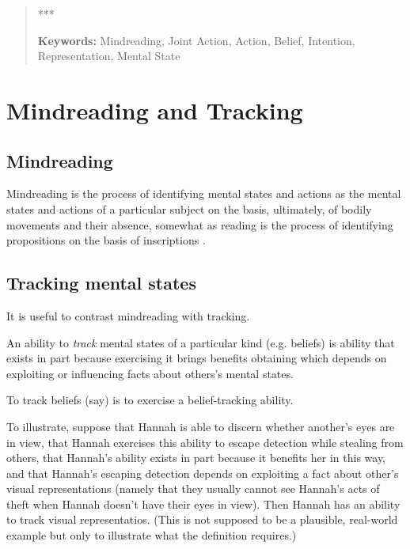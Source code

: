 \documentclass[12pt,\papersize]{extarticle}
\begin{document}
\setlength\footnotesep{1em}




\maketitle

\begin{abstract}
\noindent
***
\ 

\noindent
\textbf{Keywords:}
Mindreading, Joint Action, Action, Belief, Intention, Representation, Mental State
\end{abstract}




\section{Mindreading and Tracking}

\subsection{Mindreading}
Mindreading is 
	the process of 
	identifying mental states and actions 
	as the mental states and actions 	of a particular subject 
	on the basis, ultimately, of bodily movements and their absence,
somewhat as reading is the process of identifying propositions on the basis of inscriptions \citep[p.\ 4]{Apperly:2010kx}.



\subsection{Tracking mental states}
It is useful to contrast mindreading with tracking.

An ability to \textit{track} mental states of a particular kind (e.g. beliefs) is ability that exists in part because exercising it brings benefits obtaining which depends on exploiting or influencing facts about others's mental states.

To track beliefs (say) is to exercise a belief-tracking ability.

To illustrate, suppose that Hannah is able to discern whether another's eyes are in view, that Hannah exercises this ability to escape detection while stealing from others, that Hannah's ability exists in part because it benefits her in this way, and that Hannah's escaping detection depends on exploiting a fact about other's visual representations (namely that they usually cannot see Hannah's acts of theft when Hannah doesn't have their eyes in view).
Then Hannah has an ability to track visual representatios. 
(This is not supposed to be a plausible, real-world example but only to illustrate what the definition requires.)
\end{document}
